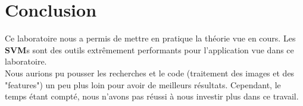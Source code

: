 
\chapter{Conclusion} %

\label{Conclusion} %



Ce laboratoire nous a permis de mettre en pratique la théorie vue en cours. Les \textbf{SVM}s sont des outils extrêmement performants pour l'application vue dans ce laboratoire. \\

Nous aurions pu pousser les recherches et le code (traitement des images et des "features") un peu plus loin pour avoir de meilleurs résultats. Cependant, le temps étant compté, nous n'avons pas réussi à nous investir plus dans ce travail. 